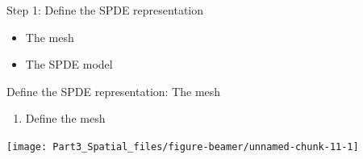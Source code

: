 \documentclass[
  ignorenonframetext,
]{beamer}
\newenvironment{Shaded}{\begin{snugshade}}{\end{snugshade}}
\newcommand{\AttributeTok}[1]{\textcolor[rgb]{0.77,0.63,0.00}{#1}}
\newcommand{\DecValTok}[1]{\textcolor[rgb]{0.00,0.00,0.81}{#1}}
\newcommand{\FunctionTok}[1]{\textcolor[rgb]{0.00,0.00,0.00}{#1}}
\newcommand{\NormalTok}[1]{#1}
\newcommand{\OtherTok}[1]{\textcolor[rgb]{0.56,0.35,0.01}{#1}}
\newcommand{\SpecialCharTok}[1]{\textcolor[rgb]{0.00,0.00,0.00}{#1}}
\providecommand{\tightlist}{%
  \setlength{\itemsep}{0pt}\setlength{\parskip}{0pt}}
\begin{document}
\begin{frame}{Step 1: Define the SPDE representation}
\protect\hypertarget{step-1-define-the-spde-representation}{}
\begin{itemize}
\item
  The mesh
\item
  The SPDE model
\end{itemize}
\end{frame}

\begin{frame}[fragile]{Define the SPDE representation: The mesh}
\protect\hypertarget{define-the-spde-representation-the-mesh}{}
\begin{enumerate}
\tightlist
\item
  Define the mesh \small
\end{enumerate}

\begin{Shaded}
\end{Shaded}

\begin{center}\texttt{[image: Part3\_Spatial\_files/figure-beamer/unnamed-chunk-11-1]} \end{center}
\normalsize
\end{frame}
\end{document}

